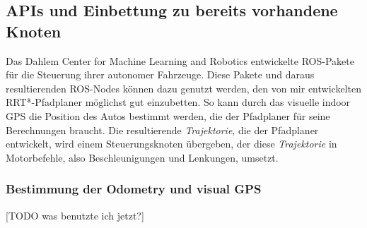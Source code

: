 \subsection{APIs und Einbettung zu bereits vorhandene Knoten}
Das Dahlem Center for Machine Learning and Robotics entwickelte ROS-Pakete für die Steuerung ihrer autonomer Fahrzeuge. Diese Pakete und daraus resultierenden ROS-Nodes können dazu genutzt werden, den von mir entwickelten RRT*-Pfadplaner möglichst gut einzubetten. So kann durch das visuelle indoor GPS die Position des Autos bestimmt werden, die der Pfadplaner für seine Berechnungen braucht. Die resultierende \textit{Trajektorie}, die der Pfadplaner entwickelt, wird einem Steuerungsknoten übergeben, der diese \textit{Trajektorie} in Motorbefehle, also Beschleunigungen und Lenkungen, umsetzt. 
\subsubsection{Bestimmung der Odometry und visual GPS}
[TODO was benutzte ich jetzt?]

